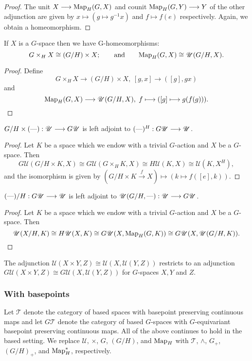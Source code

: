 \documentclass[11pt]{article}
\begin{document}
\begin{FirstNineLectures}
\begin{proof}
The unit $X\to\textup{Map}_H(G,X)$ and counit $\textup{Map}_H(G,Y)\to Y$ of the other adjunction are given by $x\mapsto (g\mapsto g^{-1}x)$ and $f\mapsto f(e)$ respectively. Again, we obtain a homeomorphism.
\end{proof}
\begin{thm*} If $X$ is a $G$-space then we have G-homeomorphisms:
\[G\times_H X\cong (G/H)\times X;\text{\qquad and\qquad}
\textup{Map}_H(G,X)\cong\mathscr{U}(G/H,X).\]
\end{thm*}
\begin{proof}
Define
\[G\times_H X\to (G/H)\times X,\hspace{3pt}[g,x]\to ([g],gx)\]
and
\[\textup{Map}_H(G,X)\to\mathscr{U}(G/H,X),\hspace{3pt}f\mapsto([g]\mapsto g(f(g))).\qedhere\]
\end{proof}
\begin{thm*} $G/H\times(\DASH):\mathscr{U}\to G\mathscr{U}$ is left adjoint to $(\DASH)^H:G\mathscr{U}\to\mathscr{U}$.
\end{thm*}
\begin{proof}
Let $K$ be a space which we endow with a trivial $G$-action and $X$ be a $G$-space. Then
\[G\mathscr{U}(G/H\times K, X)\cong G\mathscr{U}(G\times_H K,X)\cong
H\mathscr{U}(K,X)\cong\mathscr{U}(K,X^H),\]
and the isomorphism is given by $(G/H\times K\overset{f}{\to} X)\mapsto (k\mapsto f([e],k))$.
\end{proof}
\begin{thm*}
$(\DASH)/H:G\mathscr{U}\to\mathscr{U}$ is left adjoint to $\mathscr{U}(G/H,\DASH):\mathscr{U}\to G\mathscr{U}$.
\end{thm*}
\begin{proof}
Let $K$ be a space which we endow with a trivial $G$-action and $X$ be a $G$-space. Then
\[\mathscr{U}(X/H,K)\cong H\mathscr{U}(X,K)\cong G\mathscr{U}(X,\textup{Map}_H(G,K))\cong G\mathscr{U}(X,\mathscr{U}(G/H,K)).\qedhere\]
\end{proof}
\begin{thm*}
The adjunction $\mathscr{U}(X\times Y,Z)\cong\mathscr{U}(X,\mathscr{U}(Y,Z))$ restricts to an adjunction $G\mathscr{U}(X\times Y,Z)\cong G\mathscr{U}(X,\mathscr{U}(Y,Z))$ for $G$-spaces $X,Y$ and $Z$.
\end{thm*}
\subsubsection*{With basepoints}
Let $\mathscr{T}$ denote the category of based spaces with basepoint preserving continuous maps and let $G\mathscr{T}$ denote the category of based $G$-spaces with $G$-equivariant basepoint preserving continuous maps.
All of the above continues to hold in the based setting. We replace $\mathscr{U}$, $\times$, $G$, $(G/H)$, and $\textup{Map}_H$ with $\mathscr{T}$, $\wedge$, $G_+$, $(G/H)_+$, and $\textup{Map}^*_H$, respectively.


\end{FirstNineLectures}
\end{document}
